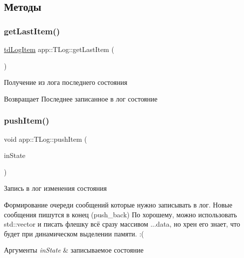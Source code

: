 \subsection{Методы}
\mbox{\label{classapp_1_1_t_log_a281a776bf33d2be787b907265e435683}} 
\subsubsection{\texorpdfstring{get\+Last\+Item()}{getLastItem()}}
{\footnotesize\ttfamily \hyperlink{structapp_1_1td_log_item}{td\+Log\+Item} app\+::\+T\+Log\+::get\+Last\+Item (\begin{DoxyParamCaption}{ }\end{DoxyParamCaption})}



Получение из лога последнего состояния 





\begin{DoxyReturn}{Возвращает}
Последнее записанное в лог состояние 
\end{DoxyReturn}
\mbox{\label{classapp_1_1_t_log_a9632f9ff3d14bd24d6587f3509fbe9de}} 
\subsubsection{\texorpdfstring{push\+Item()}{pushItem()}}
{\footnotesize\ttfamily void app\+::\+T\+Log\+::push\+Item (\begin{DoxyParamCaption}\item[{const \hyperlink{group___xD0_x9F_xD0_xB5_xD1_x80_xD0_xB5_xD1_x87_xD0_xB8_xD1_x81_xD0_xBB_xD0_xB5_xD0_xBD_xD0_xB8_xD1_x8F_ga290e8080c661e52c2f685fd4af148acf}{app\+::app\+State} \&}]{in\+State }\end{DoxyParamCaption})}



Запись в лог изменения состояния 

Формирование очереди сообщений которые нужно записывать в лог. Новые сообщения пишутся в конец (push\+\_\+back) По хорошему, можно использовать std\+::vector и писать флешку всё сразу массивом ...data, но хрен его знает, что будет при динамическом выделении памяти. \+:( 
\begin{DoxyParams}{Аргументы}
{\em in\+State} & записываемое состояние \\
\hline
\end{DoxyParams}
\mbox{\label{classapp_1_1_t_log_aa28e5b94b906fcb2f8fed5f08b92e077}} 
